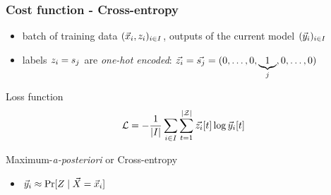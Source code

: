 
\begin{frame}
\frametitle{Cost function - Cross-entropy}
\vspace*{-3pt}
\begin{itemize}
\item batch of training data $(\vec{x}_i, z_i)_{i\in I}$, outputs of the current model $(\vec{y}_i)_{i\in I}$
\item labels $z_i=s_{j}$ are \emph{one-hot encoded}: $\vec{z_i} = \vec{s_{j}} = (0,\ldots , 0,\underbrace{1}_{j},0,\dots,0)$
\end{itemize}

\begin{block}{Loss function}
\begin{equation}\label{eq:lossfunction}
\mathcal{L} = -\frac{1}{\lvert I \rvert} \sum_{i\in I} \sum_{t=1}^{|\mathcal{Z}|}\vec{z_i}[t]\log{\ensuremath {\vec{y}}_i[t]}
\end{equation}   
\end{block}

\begin{block}{Maximum-\emph{a-posteriori} or Cross-entropy}
\begin{itemize}
\item $\vNNOutput_i \approx \prob[\given{\sensRandVar}{\vaLeakVec=\vLeakVec_i}]$
\end{itemize}
\end{block}
\end{frame}

